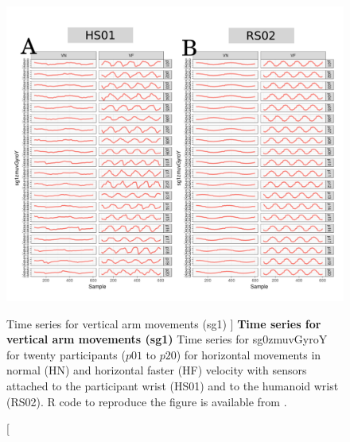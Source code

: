 \begin{figure}
\centering
\includegraphics[width=1.0\textwidth]{aV-sg1}
    	\caption
	[Time series for vertical arm movements (sg1) ]{
	{\bf Time series for vertical arm movements (sg1)}
		Time series for sg0zmuvGyroY for twenty participants 
		($p01$ to  $p20$) 
		for horizontal movements in normal (HN) and horizontal faster (HF) 
		velocity with sensors attached to the participant wrist (HS01)
		and to the humanoid wrist (RS02).
	R code to reproduce the figure is available from \cite{hwum2018}.
        }
    \label{fig:aV-sg1}
\end{figure}

